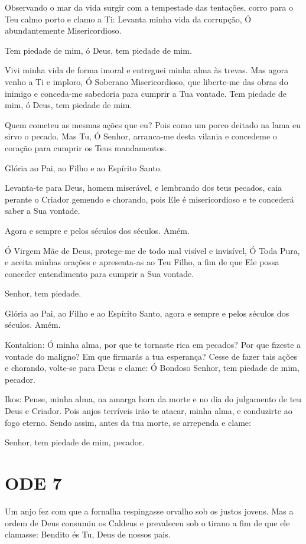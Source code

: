 \documentclass{subfiles}
\begin{document}
\eirmos{}Observando o mar da vida surgir com a tempestade das tentações,
corro para o Teu calmo porto e clamo a Ti: Levanta minha vida da corrupção,
Ó abundantemente Misericordioso.

Tem piedade de mim, ó Deus, tem piedade de mim.

Vivi minha vida de forma imoral e entreguei minha alma às trevas. Mas
agora venho a Ti e imploro, Ó Soberano Misericordioso, que liberte-me das
obras do inimigo e conceda-me sabedoria para cumprir a Tua vontade.
Tem piedade de mim, ó Deus, tem piedade de mim.

Quem cometeu as mesmas ações que eu? Pois como um porco deitado na lama eu sirvo
o pecado. Mas Tu, Ó Senhor, arranca-me desta vilania e concedeme o coração para
cumprir os Teus mandamentos.

Glória ao Pai, ao Filho e ao Espírito Santo.

Levanta-te para Deus, homem miserável, e lembrando dos teus pecados, caia
perante o Criador gemendo e chorando, pois Ele é misericordioso e te concederá
saber a Sua vontade.

Agora e sempre e pelos séculos dos séculos. Amém.

Ó Virgem Mãe de Deus, protege-me de todo mal visível e invisível, Ó
Toda Pura, e aceita minhas orações e apresenta-as ao Teu Filho, a fim de que
Ele possa conceder entendimento para cumprir a Sua vontade.

Senhor, tem piedade. 

Glória ao Pai, ao Filho e ao Espírito Santo, agora e sempre e pelos
séculos dos séculos. Amém.

Kontakion: Ó minha alma, por que te tornaste rica em pecados? Por que
fizeste a vontade do maligno? Em que firmarás a tua esperança? Cesse de fazer
tais ações e chorando, volte-se para Deus e clame: Ó Bondoso Senhor, tem
piedade de mim, pecador.

Ikos: Pense, minha alma, na amarga hora da morte e no dia do julgamento de teu
Deus e Criador. Pois anjos terríveis irão te atacar, minha alma, e conduzirte ao
fogo eterno. Sendo assim, antes da tua morte, se arrependa e clame:

Senhor, tem piedade de mim, pecador.

\section*{ODE 7}

\eirmos{}Um anjo fez com que a fornalha respingasse orvalho sob os justos
jovens. Mas a ordem de Deus consumiu os Caldeus e prevaleceu sob o tirano
a fim de que ele clamasse: Bendito és Tu, Deus de nossos pais.
\end{document}
